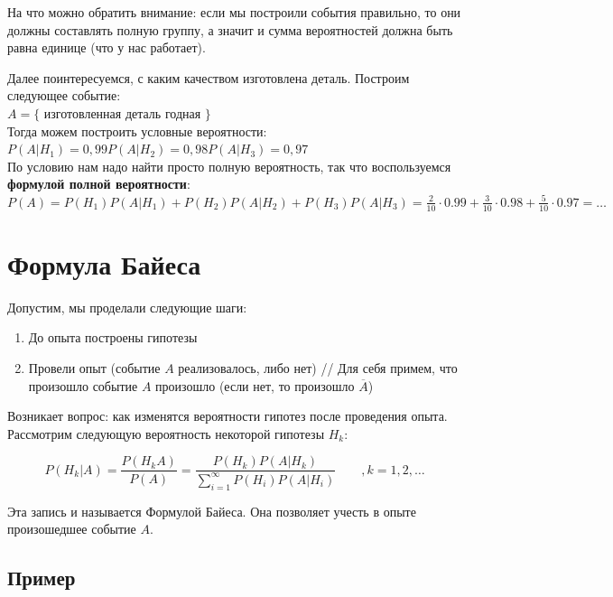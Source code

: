 \documentclass{article}
\begin{document}
На что можно обратить внимание: если мы построили события правильно, то они должны составлять полную группу, а значит и сумма вероятностей должна быть равна единице (что у нас работает).

Далее поинтересуемся, с каким качеством изготовлена деталь. Построим следующее событие:
\\

$A = \{$ изготовленная деталь годная $\}$
\\

Тогда можем построить условные вероятности:
\\

$P(A|H_1) = 0,99$\qquad$P(A|H_2) = 0,98$\qquad$P(A|H_3) = 0,97$
\\

По условию нам надо найти просто полную вероятность, так что воспользуемся \textbf{формулой полной вероятности}:
\\

$P(A) = P(H_1)P(A|H_1) + P(H_2)P(A|H_2) + P(H_3)P(A|H_3) = \frac{2}{10} \cdot 0.99 +  \frac{3}{10} \cdot 0.98 +  \frac{5}{10} \cdot 0.97 = \ldots$


\section{Формула Байеса}

Допустим, мы проделали следующие шаги:

\begin{enumerate}
\item До опыта построены гипотезы
\item Провели опыт (событие $A$ реализовалось, либо нет) // Для себя примем, что произошло событие $A$ произошло (если нет, то произошло $\overline{A}$)
\end{enumerate}

Возникает вопрос: как изменятся вероятности гипотез после проведения опыта. Рассмотрим следующую вероятность некоторой гипотезы $H_k$:

$$P(H_k | A) = \frac{P(H_kA)}{P(A)} = \frac{P(H_k)P(A|H_k)}{\sum\limits_{i = 1}^\infty P(H_i)P(A|H_i)}\qquad,k=1,2,\ldots$$

Эта запись и называется Формулой Байеса. Она позволяет учесть в опыте произошедшее событие $A$.

\subsection{Пример}
\end{document}
